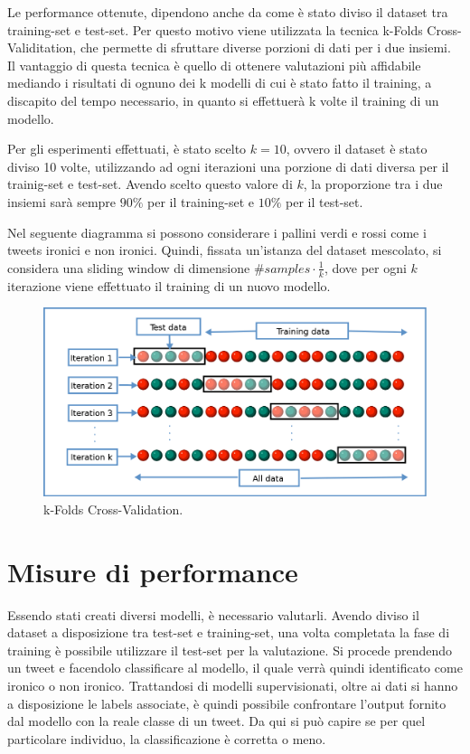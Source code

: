 \documentclass[oneside]{book}
\begin{document}
Le performance ottenute, dipendono anche da come è stato diviso il dataset tra training-set e test-set. Per questo motivo viene utilizzata la tecnica k-Folds Cross-Validitation, che permette di sfruttare diverse porzioni di dati per i due insiemi. Il vantaggio di questa tecnica è quello di ottenere valutazioni più affidabile mediando i risultati di ognuno dei k modelli di cui è stato fatto il training, a discapito del tempo necessario, in quanto si effettuerà k volte il training di un modello.

Per gli esperimenti effettuati, è stato scelto $k=10$, ovvero il dataset è stato diviso 10 volte, utilizzando ad ogni iterazioni una porzione di dati diversa per il trainig-set e test-set. Avendo scelto questo valore di $k$, la proporzione tra i due insiemi sarà sempre $90\%$ per il training-set e $10\%$ per il test-set.

Nel seguente diagramma si possono considerare i pallini verdi e rossi come i tweets ironici e non ironici. Quindi, fissata un'istanza del dataset mescolato, si considera una sliding window di dimensione $\#samples \cdot \frac{1}{k}$, dove per ogni $k$ iterazione viene effettuato il training di un nuovo modello.

\begin{figure}[!h]
	\centering
	\includegraphics[width=13cm]{assets/cross-validation.png}
	\caption[Caption for LOF]{k-Folds Cross-Validation.\footnotemark}
	\label{fig:cross-validation}
\end{figure}




\section{Misure di performance}
Essendo stati creati diversi modelli, è necessario valutarli. Avendo diviso il dataset a disposizione tra test-set e training-set, una volta completata la fase di training è possibile utilizzare il test-set per la valutazione. Si procede prendendo un tweet e facendolo classificare al modello, il quale verrà quindi identificato come ironico o non ironico. Trattandosi di modelli supervisionati, oltre ai dati si hanno a disposizione le labels associate, è quindi possibile confrontare l'output fornito dal modello con la reale classe di un tweet. Da qui si può capire se per quel particolare individuo, la classificazione è corretta o meno.
\end{document}
